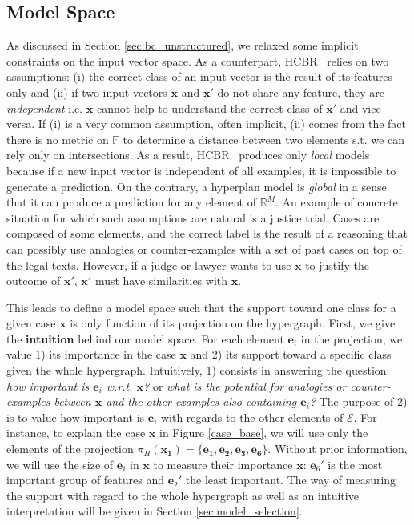 \documentclass[preprint,12pt]{elsarticle}
\def\HCBR{{\sc HCBR}}
\theoremstyle{definition}
\begin{document}
\subsection{Model Space}
\label{sec:model}
As discussed in Section \ref{sec:bc_unstructured}, we relaxed some implicit constraints on the input vector space.
As a counterpart, \HCBR~ relies on two assumptions: (i) the correct class of an input vector is the result of its features only and (ii) if two input vectors $\mathbf{x}$ and $\mathbf{x}'$ do not share any feature, they are {\it independent} i.e. $\mathbf{x}$ cannot help to understand the correct class of $\mathbf{x}'$ and vice versa. If (i) is a very common assumption, often implicit, (ii) comes from the fact there is no metric on $\mathbb F$ to determine a distance between two elements s.t. we can rely only on intersections. As a result, \HCBR~  produces only {\it local} models because if a new input vector is independent of all examples, it is impossible to generate a prediction. On the contrary, a hyperplan model is {\it global} in a sense that it can produce a prediction for any element of $\mathbb{R}^M$.
An example of concrete situation for which such assumptions are natural is a justice trial. Cases are composed of some elements, and the correct label is the result of a reasoning that can possibly use analogies or counter-examples with a set of past cases on top of the legal texts. However, if a judge or lawyer wants to use $\mathbf{x}$ to justify the outcome of $\mathbf{x}'$, $\mathbf{x}'$ must have similarities with $\mathbf{x}$. 

This leads to define a model space such that the support toward one class for a given case $\mathbf x$ is only function of its projection on the hypergraph. First, we give the {\bf intuition} behind our model space. For each element $\mathbf e_i$ in the projection, we value 1) its importance in the case $\mathbf x$ and 2) its support toward a specific class given the whole hypergraph. Intuitively, 1) consists in answering the question: {\it how important is $\mathbf e_i$ w.r.t. $\mathbf x$?} or {\it what is the potential for analogies or counter-examples between $\mathbf x$ and the other examples also containing $\mathbf e_i$?} The purpose of 2) is to value how important is $\mathbf e_i$ with regards to the other elements of $\mathcal E$. For instance, to explain the case $\mathbf x$ in Figure \ref{case_base}, we will use only the elements of the projection $\pi_H(\mathbf{x_1}) = \{ \mathbf{e_1}, \mathbf{e_2}, \mathbf{e_3}, \mathbf{e_6} \}$. Without prior information, we will use the size of $\mathbf e_i$ in $\mathbf x$ to measure their importance $\mathbf x$: $\mathbf e_6'$ is the most important group of features and $\mathbf e_2'$ the least important. The way of measuring the support with regard to the whole hypergraph as well as an intuitive interpretation will be given in Section \ref{sec:model_selection}.
\end{document}
